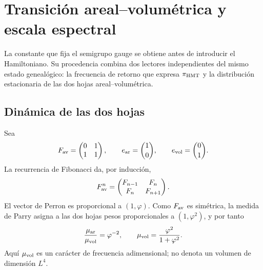 \section{Transición areal--volumétrica y escala espectral}
\label{sec:ym-areal-volumetric-scale}

La constante que fija el semigrupo gauge se obtiene antes de introducir el
Hamiltoniano. Su procedencia combina dos lectores independientes del mismo
estado genealógico: la frecuencia de retorno que expresa
\(\pi_{\rm HMT}\) y la distribución estacionaria de las dos hojas
areal--volumétrica.

\subsection{Dinámica de las dos hojas}

Sea
\begin{equation}
 F_{\rm av}=\begin{pmatrix}0&1\\1&1\end{pmatrix},
 \qquad e_{\rm ar}=\binom10,
 \qquad e_{\rm vol}=\binom01.
 \label{eq:ym-av-transition-matrix}
\end{equation}
La recurrencia de Fibonacci da, por inducción,
\begin{equation}
 F_{\rm av}^{n}
 =\begin{pmatrix}F_{n-1}&F_n\\F_n&F_{n+1}\end{pmatrix}.
 \label{eq:ym-av-fibonacci-powers}
\end{equation}
El vector de Perron es proporcional a \((1,\varphi)\). Como
\(F_{\rm av}\) es simétrica, la medida de Parry asigna a las dos hojas
pesos proporcionales a \((1,\varphi^2)\), y por tanto
\begin{equation}
 \frac{\mu_{\rm ar}}{\mu_{\rm vol}}=\varphi^{-2},
 \qquad
 \mu_{\rm vol}=\frac{\varphi^2}{1+\varphi^2}.
 \label{eq:ym-av-parry-weights}
\end{equation}
Aquí \(\mu_{\rm vol}\) es un carácter de frecuencia adimensional; no
denota un volumen de dimensión \(L^4\).

